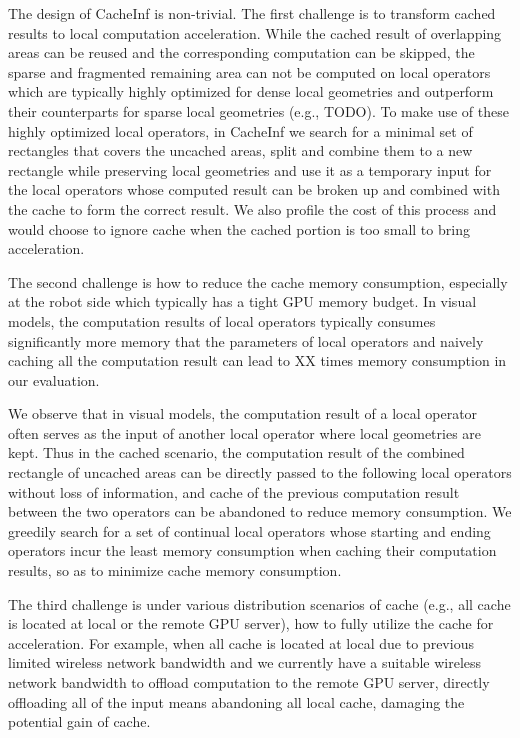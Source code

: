 The design of CacheInf is non-trivial.
The first challenge is to transform cached results to local computation acceleration.
While the cached result of overlapping areas can be reused and the corresponding computation can be skipped, the sparse and fragmented remaining area can not be computed on local operators which are typically highly optimized for dense local geometries and outperform their counterparts for sparse local geometries (e.g., TODO).
To make use of these highly optimized local operators, in CacheInf we search for a minimal set of rectangles that covers the uncached areas, split and combine them to a new rectangle while preserving local geometries and use it as a temporary input for the local operators whose computed result can be broken up and combined with the cache to form the correct result.
We also profile the cost of this process and would choose to ignore cache when the cached portion is too small to bring acceleration.

The second challenge is how to reduce the cache memory consumption, especially at the robot side which typically has a tight GPU memory budget.
In visual models, the computation results of local operators typically consumes significantly more memory that the parameters of local operators and naively caching all the computation result can lead to XX times memory consumption in our evaluation.

We observe that in visual models, the computation result of a local operator often serves as the input of another local operator where local geometries are kept. 
Thus in the cached scenario, the computation result of the combined rectangle of uncached areas can be directly passed to the following local operators without loss of information, and cache of the previous computation result between the two operators can be abandoned to reduce memory consumption.
We greedily search for a set of continual local operators whose starting and ending operators incur the least memory consumption when caching their computation results, so as to minimize cache memory consumption.

The third challenge is under various distribution scenarios of cache (e.g., all cache is located at local or the remote GPU server), how to fully utilize the cache for acceleration.
For example, when all cache is located at local due to previous limited wireless network bandwidth and we currently have a suitable wireless network bandwidth to offload computation to the remote GPU server, directly offloading all of the input means abandoning all local cache, damaging the potential gain of cache.

